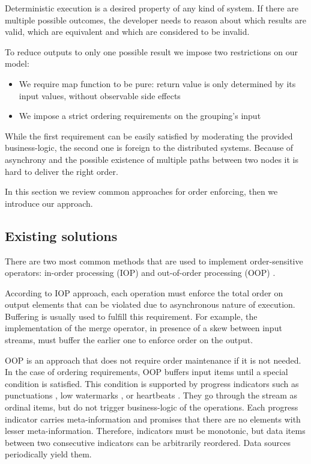 \label {fs-collision}

Deterministic execution is a desired property of any kind of system. If there are multiple possible outcomes, the developer needs to reason about which results are valid, which are equivalent and which are considered to be invalid.

To reduce outputs to only one possible result we impose two restrictions on our model: 

\begin{itemize}
  \item We require map function to be pure: return value is only determined by its input values, without observable side effects
  \item We impose a strict ordering requirements on the grouping's input
\end{itemize}

While the first requirement can be easily satisfied by moderating the provided business-logic, the second one is foreign to the distributed systems. Because of asynchrony and the possible existence of multiple paths between two nodes it is hard to deliver the right order. 

In this section we review common approaches for order enforcing, then we introduce our approach.

\subsection{Existing solutions}

There are two most common methods that are used to implement order-sensitive operators: in-order processing (IOP) \cite{Arasu:2006:CCQ:1146461.1146463, Cranor:2003:GSD:872757.872838, hammad2004optimizing} and out-of-order processing (OOP) \cite{Li:2008:OPN:1453856.1453890}.

According to IOP approach, each operation must enforce the total order on output elements that can be violated due to asynchronous nature of execution. Buffering is usually used to fulfill this requirement. For example, the implementation of the merge operator, in presence of a skew between input streams, must buffer the earlier one to enforce order on the output.

OOP is an approach that does not require order maintenance if it is not needed. In the case of ordering requirements, OOP buffers input items until a special condition is satisfied. This condition is supported by progress indicators such as punctuations \cite{Tucker:2003:EPS:776752.776780}, low watermarks \cite{Akidau:2013:MFS:2536222.2536229}, or heartbeats \cite{Srivastava:2004:FTM:1055558.1055596}. They go through the stream as ordinal items, but do not trigger business-logic of the operations. Each progress indicator carries meta-information and promises that there are no elements with lesser meta-information. Therefore, indicators must be monotonic, but data items between two consecutive indicators can be arbitrarily reordered. Data sources periodically yield them.

